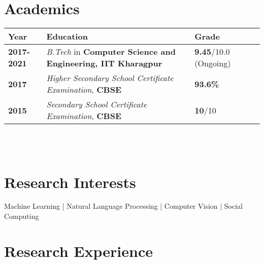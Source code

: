 \documentclass[a4paper,10pt]{extarticle} %
\begin{document}
\vspace{-0.6cm}
\section{\textcolor{primary}{Academics}}

\indent \begin{tabular}{ l @{\hskip 1cm} l @{\hskip 2.5cm} l @{\hskip 1.8cm} l }
\textbf{Year} & \textbf{Education} & \textbf{Grade}\\
\hline
\textbf{2017-2021} & \textit{B.Tech} in \textbf{Computer Science and Engineering, IIT Kharagpur} & \textbf{9.45}/10.0 (Ongoing) \\
\textbf{2017} & \textit{Higher Secondary School Certificate Examination}, \textbf{CBSE} & \textbf{93.6\%} \\
\textbf{2015} & \textit{Secondary School Certificate Examination}, \textbf{CBSE} & \textbf{10}/10\\
\end{tabular} \\

\\

\vspace{-0.3cm}
\section{\textcolor{primary}{Research Interests}}

\noindent Machine Learning | Natural Language Processing | Computer Vision | Social Computing %




\section{\textcolor{primary}{Research Experience}}
\end{document}
